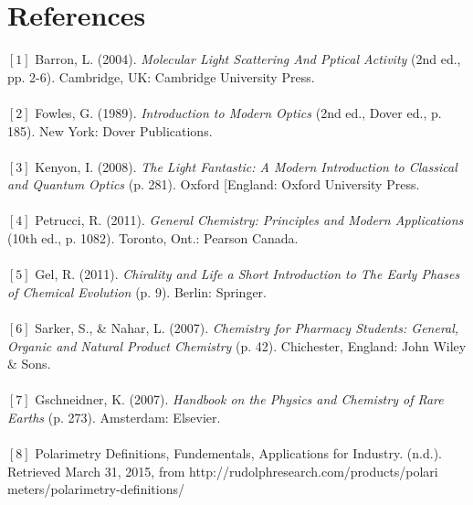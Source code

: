 \documentclass[a4paper,12pt]{report}
\begin{document}
\chapter{References}
$[1]$ Barron, L. (2004).\textit{ Molecular Light Scattering And Pptical Activity} (2nd ed., pp. 2-6). Cambridge, UK: Cambridge University Press.\\\\
$[2]$ Fowles, G. (1989). \textit{Introduction to Modern Optics} (2nd ed., Dover ed., p. 185). New York: Dover Publications.\\\\
$[3]$ Kenyon, I. (2008). \textit{The Light Fantastic: A Modern Introduction to Classical and Quantum Optics} (p. 281). Oxford [England: Oxford University Press.\\\\
$[4]$ Petrucci, R. (2011). \textit{General Chemistry: Principles and Modern Applications} (10th ed., p. 1082). Toronto, Ont.: Pearson Canada.\\\\
$[5]$ Gel, R. (2011). \textit{Chirality and Life a Short Introduction to The Early Phases of Chemical Evolution} (p. 9). Berlin: Springer.\\\\
$[6]$ Sarker, S., \& Nahar, L. (2007). \textit{Chemistry for Pharmacy Students: General, Organic and Natural Product Chemistry} (p. 42). Chichester, England: John Wiley \& Sons.\\\\
$[7]$ Gschneidner, K. (2007). \textit{Handbook on the Physics and Chemistry of Rare Earths} (p. 273). Amsterdam: Elsevier.\\\\
$[8]$ Polarimetry Definitions, Fundementals, Applications for Industry. (n.d.). Retrieved March 31, 2015, from http://rudolphresearch.com/products/polari\\meters/polarimetry-definitions/
\end{document}
